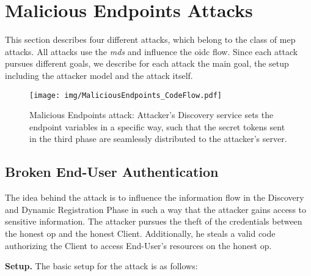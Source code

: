 \documentclass[conference,compsoc]{IEEEtran}
\renewcommand*{\paragraph}[1]{\vspace{2mm}\noindent\textbf{#1.}}
\begin{document}
 \section{Malicious Endpoints Attacks}
\label{sec:maliciousendpointattack}

This section describes four different attacks, which belong to the class of \gls{mep} attacks.
All attacks use the \emph{\gls{mds}} and influence the \gls{oidc} flow.
Since each attack pursues different goals, we describe for each attack the main goal, the setup including the attacker model and the attack itself.

\begin{figure*}[t]
 \centering
 \texttt{[image: img/MaliciousEndpoints\_CodeFlow.pdf]}
\caption{Malicious Endpoints attack: Attacker's Discovery service sets the endpoint variables in a specific way, such that the secret tokens sent in the third phase are seamlessly distributed to the attacker's server.}
 \label{fig:maliciousEndpoints}
\end{figure*}

\subsection{Broken End-User Authentication}
\label{sec:brokenenduserauth}
The idea behind the attack is to influence the information flow in the Discovery and Dynamic Registration Phase in such a way that the attacker gains access to sensitive information.
The attacker pursues the theft of the credentials between the honest \gls{op} and the honest Client.
Additionally, he steals a valid \gls{code} authorizing the Client to access End-User's resources on the honest \gls{op}.



\paragraph{Setup}
The basic setup for the attack is as follows:
\end{document}
